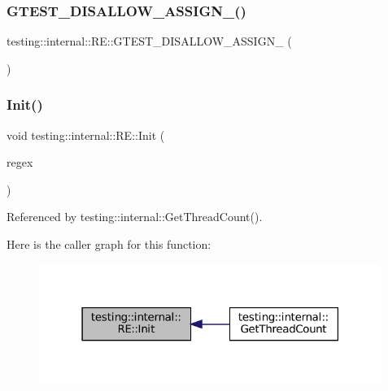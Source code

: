 \subsubsection{\texorpdfstring{G\+T\+E\+S\+T\+\_\+\+D\+I\+S\+A\+L\+L\+O\+W\+\_\+\+A\+S\+S\+I\+G\+N\+\_\+()}{GTEST\_DISALLOW\_ASSIGN\_()}}
{\footnotesize\ttfamily testing\+::internal\+::\+R\+E\+::\+G\+T\+E\+S\+T\+\_\+\+D\+I\+S\+A\+L\+L\+O\+W\+\_\+\+A\+S\+S\+I\+G\+N\+\_\+ (\begin{DoxyParamCaption}\item[{\hyperlink{classtesting_1_1internal_1_1RE}{RE}}]{ }\end{DoxyParamCaption})\hspace{0.3cm}{\ttfamily [private]}}

\mbox{\label{classtesting_1_1internal_1_1RE_a4c3a519ce849abc57d6d5fffbf1e04dc}} 
\subsubsection{\texorpdfstring{Init()}{Init()}}
{\footnotesize\ttfamily void testing\+::internal\+::\+R\+E\+::\+Init (\begin{DoxyParamCaption}\item[{const char $\ast$}]{regex }\end{DoxyParamCaption})\hspace{0.3cm}{\ttfamily [private]}}



Referenced by testing\+::internal\+::\+Get\+Thread\+Count().

Here is the caller graph for this function\+:
\nopagebreak
\begin{figure}[H]
\begin{center}
\leavevmode
\includegraphics[width=316pt]{classtesting_1_1internal_1_1RE_a4c3a519ce849abc57d6d5fffbf1e04dc_icgraph}
\end{center}
\end{figure}
\mbox{\label{classtesting_1_1internal_1_1RE_a1e81f9a87211bdca645e025f8f0236c8}} 
